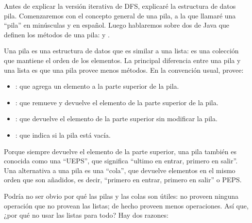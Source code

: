 \documentclass[12pt]{book}
\theoremstyle{exercise}
\begin{document}
Antes de explicar la versión iterativa de DFS, explicaré
la estructura de datos pila. Comenzaremos con el concepto general
de una pila, a la que llamaré una ``pila'' en minúsculas y en español.
Luego hablaremos sobre dos  de Java que definen los
métodos de una pila:  y .



Una pila es una estructura de datos que es similar a una lista: es una
colección que mantiene el orden de los elementos. La principal
diferencia entre una pila y una lista es que una pila provee menos
métodos. En la convención usual, provee:

\begin{itemize}

\item
  : que agrega un elemento a la parte superior de la pila.

\item
  : que remueve y devuelve el elemento de la parte superior de la pila.

\item
  : que devuelve el elemento de la parte superior sin modificar
  la pila.

\item
  : que indica si la pila está vacía.

\end{itemize}

Porque  siempre devuelve el elemento de la parte superior, una pila
también es conocida como una ``UEPS'', que significa ``ultimo en entrar, primero
en salir''. Una alternativa a una pila es una ``cola'', que devuelve elementos en el
mismo orden que son añadidos, es decir, ``primero en entrar, primero en salir''
o PEPS.


Podría no ser obvio por qué las pilas y las colas son útiles: no proveen
ninguna operación que no provean las listas; de hecho proveen
menos operaciones. Así que, ¿por qué no usar las listas para todo? Hay
dos razones:
\end{document}
